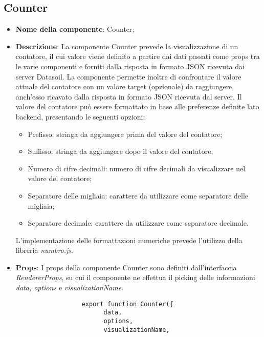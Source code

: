 \subsection{Counter}
\begin{itemize}
      \item \textbf{Nome della componente}: Counter;
      \item \textbf{Descrizione}: La componente Counter prevede la visualizzazione di un contatore, il cui valore viene definito a partire dai dati passati
            come props tra le varie componenti e forniti dalla risposta in formato JSON ricevuta dai server Datasoil. \newline
            La componente permette inoltre di confrontare il valore attuale del contatore con un valore target (opzionale) da raggiungere, anch'esso ricavato
            dalla risposta in formato JSON ricevuta dal server. \newline
            Il valore del contatore può essere formattato in base alle preferenze definite lato backend, presentando le seguenti opzioni:
            \begin{itemize}
                  \item Prefisso: stringa da aggiungere prima del valore del contatore;
                  \item Suffisso: stringa da aggiungere dopo il valore del contatore;
                  \item Numero di cifre decimali: numero di cifre decimali da visualizzare nel valore del contatore;
                  \item Separatore delle migliaia: carattere da utilizzare come separatore delle migliaia;
                  \item Separatore decimale: carattere da utilizzare come separatore decimale.
            \end{itemize}
            L'implementazione delle formattazioni numeriche prevede l'utilizzo della libreria \textit{numbro.js}.
      \item \textbf{Props}: I props della componente Counter sono definiti dall'interfaccia \textit{RendererProps}, su cui il componente ne effettua il picking
            delle informazioni \textit{data, options} e \textit{visualizationName}.
            \begin{listing}[H]
                  \begin{verbatim}
                  export function Counter({
                        data,
                        options,
                        visualizationName,

\end{verbatim}
\end{listing}
\end{itemize}

